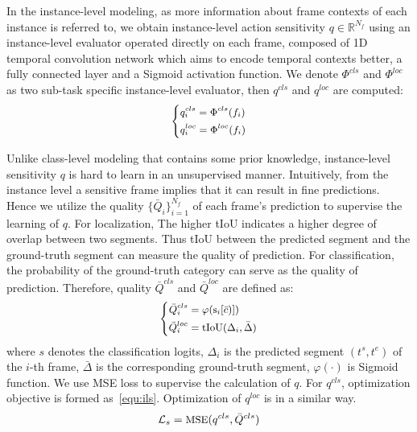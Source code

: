 \documentclass[10pt,twocolumn,letterpaper]{article}
\begin{document}
In the instance-level modeling, as more information about frame contexts of each instance is referred to, we obtain instance-level action sensitivity $q \in \mathbb{R}^{N_f}$ using an instance-level evaluator operated directly on each frame, composed of 1D temporal convolution network which aims to encode temporal contexts better, a fully connected layer and a Sigmoid activation function. We denote $\Phi^{cls}$ and $\Phi^{loc}$ as two sub-task specific instance-level evaluator, then $q^{cls}$ and $q^{loc}$ are computed:  
\begin{equation} \small
\left\{
\begin{aligned}
 & q_i^{cls} = \Phi^{cls}(f_i)\\
& q_i^{loc}  = \Phi^{loc}(f_i)
\end{aligned}
\right.
\end{equation}

Unlike class-level modeling that contains some prior knowledge, instance-level sensitivity $q$ is hard to learn in an unsupervised manner. Intuitively, from the instance level a sensitive frame implies that it can result in fine predictions. Hence we utilize the quality $\{\bar Q_i\}_{i=1}^{N_f}$ of each frame's prediction to supervise the learning of $q$. 
For localization, The higher tIoU indicates a higher degree of overlap between two segments. Thus tIoU between the predicted segment and the ground-truth segment can measure the quality of prediction.
For classification, the probability of the ground-truth category can serve as the quality of prediction.
Therefore, quality  $\bar Q^{cls}$ and $\bar Q^{loc}$ are defined as: 
\begin{equation} \small
\left\{
\begin{aligned}
 \bar Q_i^{cls} &= \varphi (\text{s}_i[\bar c)]) \\
\bar Q_i^{loc} &= \text{tIoU}(\Delta_i, \bar \Delta)
\end{aligned}
\right.
\end{equation}
where $s$ denotes the classification logits, $\Delta_i$ is the predicted segment $(t^s, t^e)$ of the $i$-th frame, $\bar \Delta$ is the corresponding ground-truth segment, $\varphi(\cdot)$ is Sigmoid function. We use MSE loss to supervise the calculation of $q$. For $q^{cls}$, optimization objective is formed as~\ref{equ:ils}. Optimization of $q^{loc}$ is in a similar way.
\begin{equation} \small \label{equ:ils}
\mathcal{L}_{s} = \text{MSE} (q^{cls}, \bar Q^{cls}) 
\end{equation}
\end{document}
